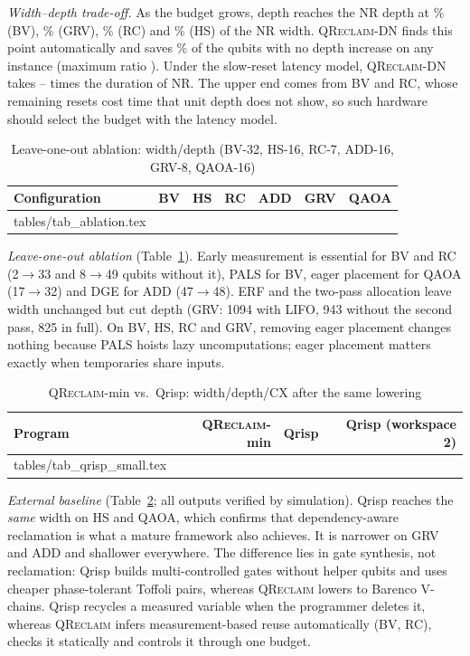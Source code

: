 \documentclass[conference,a4paper]{IEEEtran}
\makeatletter
\newcommand{\QR}{\textup{\textsc{QReclaim}}}
\newcommand{\inputtable}[1]{\@@input #1 }
\makeatother
\begin{document}
\emph{Width--depth trade-off.} As the budget grows, depth reaches the NR depth at \KneeBV\% (BV), \KneeGRV\% (GRV), \KneeRC\% (RC) and \KneeHS\% (HS) of the NR width. \QR{}-DN finds this point automatically and saves \RedDNvsNR\% of the qubits with no depth increase on any instance (maximum ratio \DNMaxDepth). Under the slow-reset latency model, \QR{}-DN takes \TimeTenMin--\TimeTenMax{} times the duration of NR. The upper end comes from BV and RC, whose remaining resets cost time that unit depth does not show, so such hardware should select the budget with the latency model.

\begin{table}[t]
\caption{Leave-one-out ablation: width/depth (BV-32, HS-16, RC-7, ADD-16, GRV-8, QAOA-16)}
\label{tab:ablation}
\centering
\scriptsize
\setlength{\tabcolsep}{2pt}
\begin{tabular}{@{}lrrrrrr@{}}
\toprule
Configuration & BV & HS & RC & ADD & GRV & QAOA \\
\midrule
\inputtable{tables/tab_ablation.tex}
\bottomrule
\end{tabular}
\end{table}

\emph{Leave-one-out ablation} (Table~\ref{tab:ablation}). Early measurement is essential for BV and RC (2$\to$33 and 8$\to$49 qubits without it), PALS for BV, eager placement for QAOA (17$\to$32) and DGE for ADD (47$\to$48). ERF and the two-pass allocation leave width unchanged but cut depth (GRV: 1094 with LIFO, 943 without the second pass, 825 in full). On BV, HS, RC and GRV, removing eager placement changes nothing because PALS hoists lazy uncomputations; eager placement matters exactly when temporaries share inputs.

\begin{table}[t]
\caption{\QR{}-min vs.\ Qrisp: width/depth/CX after the same lowering}
\label{tab:qrisp}
\centering
\scriptsize
\setlength{\tabcolsep}{3pt}
\begin{tabular}{@{}lrrr@{}}
\toprule
Program & \QR{}-min & Qrisp & Qrisp (workspace 2) \\
\midrule
\inputtable{tables/tab_qrisp_small.tex}
\bottomrule
\end{tabular}
\end{table}

\emph{External baseline} (Table~\ref{tab:qrisp}; all outputs verified by simulation). Qrisp reaches the \emph{same} width on HS and QAOA, which confirms that dependency-aware reclamation is what a mature framework also achieves. It is narrower on GRV and ADD and shallower everywhere. The difference lies in gate synthesis, not reclamation: Qrisp builds multi-controlled gates without helper qubits and uses cheaper phase-tolerant Toffoli pairs, whereas \QR{} lowers to Barenco V-chains. Qrisp recycles a measured variable when the programmer deletes it, whereas \QR{} infers measurement-based reuse automatically (BV, RC), checks it statically and controls it through one budget.
\end{document}
